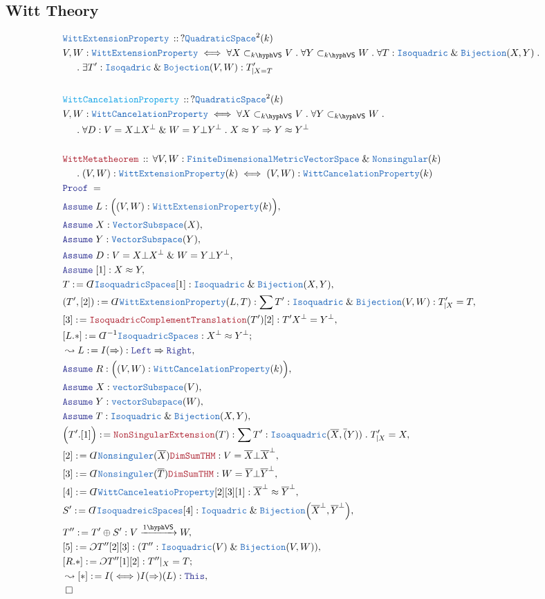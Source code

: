 \documentclass[12pt]{scrartcl}%
\newcommand{\TYPE}[1]{\textcolor{NavyBlue}{\mathtt{#1}}}%
\newcommand{\FUNC}[1]{\textcolor{Cerulean}{\mathtt{#1}}}%
\newcommand{\LOGIC}[1]{\textcolor{Blue}{\mathtt{#1}}}%
\newcommand{\THM}[1]{\textcolor{Maroon}{\mathtt{#1}}}%
\renewcommand{\.}{\; . \;} %
\newcommand{\de}{: \kern 0.1pc =} %
\newcommand{\Theorem}[2]{& \THM{#1} \, :: \, #2 \\ & \Proof = \\ } %
\newcommand{\DeclareType}[2]{& \TYPE{#1} \, :: \, #2 \\}%
\newcommand{\DefineType}[3]{& #1 : \TYPE{#2} \iff #3 \\}%
\newcommand{\DeclareFunc}[2]{& \FUNC{#1} \, :: \, #2 \\}%
\newcommand{\NewLine}{\\ & \kern 1pc}%
\newcommand{\Page}[1]{ \begin{align*} #1 \end{align*}  }%
\newcommand{ \bd }{ \ByDef }%
\renewcommand{\And}{\; \& \;}%
\newcommand{\Say}[3]{& #1 \de #2 : #3, \\} %
\newcommand{\Conclude}[3]{& #1 \de #2 : #3; \\}%
\newcommand{\Derive}[3]{& \leadsto #1 \de #2 : #3, \\} %
\newcommand{\Assume}[2]{& \LOGIC{Assume} \; #1 : #2, \\} %
\newcommand{\QED}{\; \square} %
\newcommand{\EndProof}{& \QED \\} %
\newcommand{\ByDef}{\rotatebox[origin=c]{-180}{$D$}}%
\newcommand{\ByConstr}{\rotatebox[origin=c]{-180}{$C$}}%
\newcommand{\Proof}{\LOGIC{Proof} \; } %
\newcommand{\Arrow}[1]{\xrightarrow{#1}}%
\newcommand{\subvec}[1]{\subset_{\VS{#1}}}%
\newcommand{\FDMVS}{\TYPE{FiniteDimensionalMetricVectorSpace}}
\newcommand{\VS}[1]{#1\hyph\mathsf{VS}} %
\begin{document}
\subsection{Witt Theory}
\Page{
	\DeclareType{WittExtensionProperty}{?\TYPE{QuadraticSpace}^2(k)}
	\DefineType{V,W}{WittExtensionProperty}{\forall X \subvec{k} V \. \forall Y \subvec{k} W \. \forall T : \TYPE{Isoquadric} \And \TYPE{Bijection}(X,Y) \.  \NewLine \. \exists T' : \TYPE{Isoqadric} \And \TYPE{Bojection}(V,W) : T'_{|X = T}}
	\\
	\DeclareFunc{WittCancelationProperty}{?\TYPE{QuadraticSpace}^2(k)}
	\DefineType{V,W}{WittCancelationProperty}{\forall X \subvec{k} V \. \forall Y \subvec{k} W \. \NewLine \.  \forall D : V = X \bot X^\bot \And W = Y \bot Y^\bot \. X \approx Y \Rightarrow Y \approx Y^\bot  }
	\\
	\Theorem{WittMetatheorem}{\forall V,W : \FDMVS \And  \TYPE{Nonsingular}(k) \NewLine \.  (V,W) : \TYPE{WittExtensionProperty}(k) \iff (V,W) : \TYPE{WittCancelationProperty}(k) }
	\Assume{L}{\Big((V,W) : \TYPE{WittExtensionProperty}(k)\Big)}
	\Assume{X}{\TYPE{VectorSubspace}(X)}
	\Assume{Y}{\TYPE{VectorSubspace}(Y)}
	\Assume{D}{ V = X \bot X^\bot \And W = Y \bot Y^\bot  }
	\Assume{[1]}{X \approx Y}
	\Say{T}{\bd \TYPE{IsoquadricSpaces}[1]}{\TYPE{Isoquadric} \And \TYPE{Bijection}(X,Y)}
	\Say{(T',[2])}{\bd \TYPE{WittExtensionProperty}(L,T)}{\sum T' : \TYPE{Isoquadric} \And \TYPE{Bijection}(V,W) : T'_{|X} = T}
	\Say{[3]}{\THM{IsoquadricComplementTranslation}(T')[2]}{T'X^\bot = Y^\bot}
	\Conclude{[L.*]}{\bd^{-1} \TYPE{IsoquadricSpaces}}{X^\bot \approx Y^\bot}
	\Derive{L}{I(\Rightarrow)}{\LOGIC{Left} \Rightarrow \LOGIC{Right}}
	\Assume{R}{\Big( (V,W) : \TYPE{WittCancelationProperty}(k) \Big)} 
	\Assume{X}{\TYPE{vectorSubspace}(V)}
	\Assume{Y}{\TYPE{vectorSubspace}(W)}
	\Assume{T}{\TYPE{Isoquadric} \And \TYPE{Bijection}(X,Y)}
	\Say{\Big(T'.[1]\Big)}{\THM{NonSingularExtension}(T)}{ \sum T' : \TYPE{Isoaquadric}(\overline{X},\overline(Y)) \. T'_{|X} = X  }
	\Say{[2]}{\bd \TYPE{Nonsinguler}(\overline{X})\THM{DimSumTHM}}{ V = \overline{X} \bot \overline{X}^\bot }
	\Say{[3]}{\bd \TYPE{Nonsinguler}(\overline{T})\THM{DimSumTHM}}{ W = \overline{Y} \bot \overline{Y}^\bot }
	\Say{[4]}{\bd \TYPE{WittCanceleatioProperty}[2][3][1]}{\overline{X}^\bot \approx \overline{Y}^\bot}
	\Say{S'}{\bd \TYPE{IsoquadreicSpaces}[4]}{\TYPE{Ioquadric} \And \TYPE{Bijection}\Big( \overline{X}^\bot,\overline{Y}^\bot\Big)}
	\Say{T''}{T' \oplus S'}{V \Arrow{\VS{1}} W}
	\Say{[5]}{\ByConstr T''[2][3]}{(T'' : \TYPE{Isoquadric}(V) \And \TYPE{Bijection}(V,W))}
	\Conclude{[R.*]}{\ByConstr T'' [1][2]}{T''|_{X} = T}
	\Derive{[*]}{I(\iff)I(\Rightarrow)(L)}{\LOGIC{This}}
	\EndProof
}
\newpage
\end{document}
